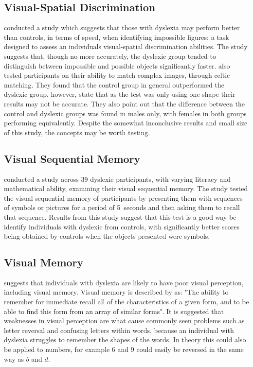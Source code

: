 \documentclass[journal]{IEEEtran}
\begin{document}
\subsection{Visual-Spatial Discrimination}
\label{sec:visualspatial}
\cite{figuresceltic} conducted a study which suggests that those with dyslexia may perform better than controls, in terms of speed, when identifying impossible figures; a task designed to assess an individuals visual-spatial discrimination abilities. The study suggests that, though no more accurately, the dyslexic group tended to distinguish between impossible and possible objects significantly faster. \cite{figuresceltic} also tested participants on their ability to match complex images, through celtic matching. They found that the control group in general outperformed the dyslexic group, however, state that as the test was only using one shape their results may not be accurate. They also point out that the difference between the control and dyslexic groups was found in males only, with females in both groups performing equivalently. Despite the somewhat inconclusive results and small size of this study, the concepts may be worth testing. 

\subsection{Visual Sequential Memory}
\label{sec:visualsequentialmemory}
\cite{sequential} conducted a study across 39 dyslexic participants, with varying literacy and mathematical ability, examining their visual sequential memory. The study tested the visual sequential memory of participants by presenting them with sequences of symbols or pictures for a period of 5~seconds and then asking them to recall that sequence.  Results from this study suggest that this test is a good way be identify individuals with dyslexic from controls, with significantly better scores being obtained by controls when the objects presented were symbols.
 
\subsection{Visual Memory}
\label{sec:visualmemory}
\cite{snowlinghandbook} suggests that individuals with dyslexia are likely to have poor visual perception, including visual memory. 
Visual memory is described by \cite{snowlinghandbook} as: "The ability to remember for immediate recall all of the characteristics of a given form, and to be able to find this form from an array of similar forms". It is suggested that weaknesses in visual perception are what cause commonly seen problems such as letter reversal and confusing letters within words, because an individual with dyslexia struggles to remember the shapes of the words. In theory this could also be applied to numbers, for example $6$ and $9$ could easily be reversed in the  same way as $b$ and $d$.
\end{document}
